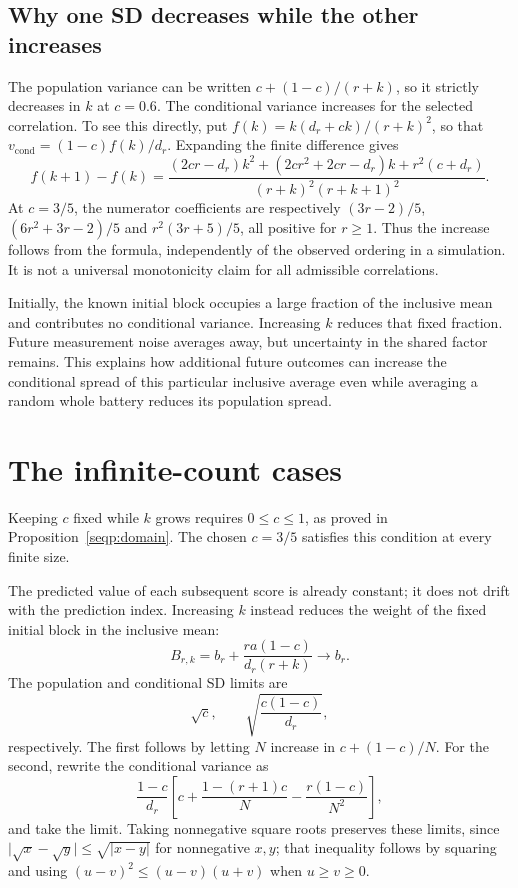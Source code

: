 \section{Why one SD decreases while the other increases}
\label{sec:seq-sim-monotonicity}
The population variance can be written
\(c+(1-c)/(r+k)\), so it strictly decreases in \(k\) at \(c=0.6\).
The conditional variance increases for the selected correlation. To see
this directly, put \(f(k)=k(d_r+ck)/(r+k)^2\), so that
\(v_{\mathrm{cond}}=(1-c)f(k)/d_r\). Expanding the finite difference gives
\[
 f(k+1)-f(k)=
 \frac{(2cr-d_r)k^2+(2cr^2+2cr-d_r)k+r^2(c+d_r)}
 {(r+k)^2(r+k+1)^2}.
\]
At \(c=3/5\), the numerator coefficients are respectively
\((3r-2)/5\), \((6r^2+3r-2)/5\) and
\(r^2(3r+5)/5\), all positive for \(r\geq1\). Thus the increase follows
from the formula, independently of the observed ordering in a simulation.
It is not a universal monotonicity claim for all admissible correlations.

Initially, the known initial block occupies a large fraction of the
inclusive mean and contributes no conditional variance. Increasing
\(k\) reduces that fixed fraction. Future measurement noise averages
away, but uncertainty in the shared factor remains. This explains how
additional future outcomes can increase the conditional spread of this
particular inclusive average even while averaging a random whole battery
reduces its population spread.

\chapter{The infinite-count cases}
\label{sec:seq-sim-limits}

Keeping \(c\) fixed while \(k\) grows requires \(0\leq c\leq1\),
as proved in Proposition~\ref{seqp:domain}. The chosen \(c=3/5\)
satisfies this condition at every finite size.

The predicted value of each subsequent score is already constant; it
does not drift with the prediction index. Increasing \(k\) instead
reduces the weight of the fixed initial block in the inclusive mean:
\[
 B_{r,k}=b_r+\frac{ra(1-c)}{d_r(r+k)}\longrightarrow b_r.
\]
The population and conditional SD limits are
\begin{equation}
 \sqrt c,\qquad \sqrt{\frac{c(1-c)}{d_r}},
 \label{eq:seq-sim-limit-sds}
\end{equation}
respectively. The first follows by letting \(N\) increase in
\(c+(1-c)/N\). For the second, rewrite the conditional variance as
\[
 \frac{1-c}{d_r}\left[
 c+\frac{1-(r+1)c}{N}-\frac{r(1-c)}{N^2}\right],
\]
and take the limit. Taking nonnegative square roots preserves these
limits, since \(\lvert\sqrt{x}-\sqrt y\rvert\leq\sqrt{|x-y|}\)
for nonnegative \(x,y\); that inequality follows by squaring and using
\((u-v)^2\leq(u-v)(u+v)\) when \(u\geq v\geq0\).

